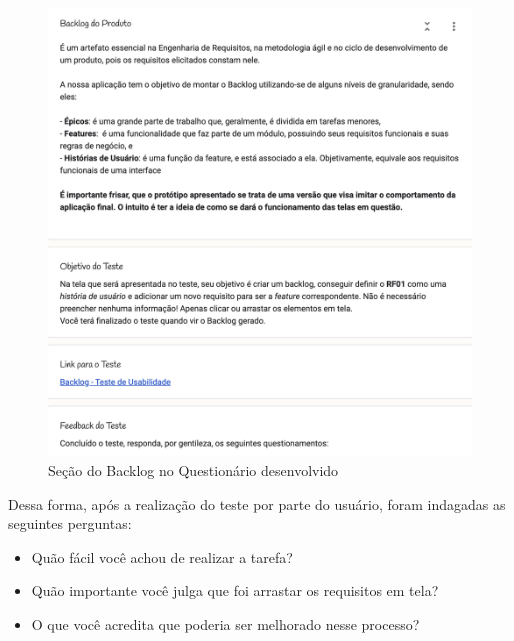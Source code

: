 \begin{figure}[H]
    \begin{center}
        \caption{{Seção do Backlog no Questionário desenvolvido}}
        \label{fig:backlog_secao}
        \includegraphics[scale=0.5]{figuras/questionario/backlog-section-1.png}
    \end{center}
\end{figure}

Dessa forma, após a realização do teste por parte do usuário, foram indagadas as seguintes perguntas:

\begin{itemize}
    \item Quão fácil você achou de realizar a tarefa?
    \item Quão importante você julga que foi arrastar os requisitos em tela?
    \item O que você acredita que poderia ser melhorado nesse processo?
\end{itemize}

